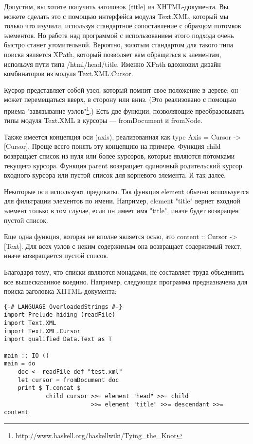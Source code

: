 Допустим, вы хотите получить заголовок (title) из XHTML-документа. Вы можете сделать это с помощью интерфейса модуля Text.XML, который мы только что изучили, используя стандартное сопоставление с образцом потомков элементов. Но работа над программой с использованием этого подхода очень быстро станет утомительной. Вероятно, золотым стандартом для такого типа поиска является XPath, который позволяет вам обращаться к элементам, используя пути типа /html/head/title. Именно XPath вдохновил дизайн комбинаторов из модуля Text.XML.Cursor.

Кусрор представляет собой узел, который помнит свое положение в дереве; он может перемещаться вверх, в сторону или вниз. (Это реализовано с помощью приема "завязывание узлов"\footnote{http://www.haskell.org/haskellwiki/Tying_the_Knot}.) Есть две функции, позволяющие преобразовывать типы модуля Text.XML в курсоры --- fromDocument и fromNode.

Также имеется концепция оси (axis), реализованная как type Axis = Cursor -> [Cursor]. Проще всего понять эту концепцию на примере. Функция child возвращает список из нуля или более курсоров, которые являются потомками текущего курсора. Функция parent возвращает одиночный родительский курсор входного курсора или пустой список для корневого элемента. И так далее.

Некоторые оси используют предикаты. Так функция element обычно используется для фильтрации элементов по имени. Например, element "title" вернет входной элемент только в том случае, если он имеет имя "title", иначе будет возвращен пустой список.

Еще одна функция, которая не вполне является осью, это content :: Cursor -> [Text]. Для всех узлов с неким содержимым она возвращает содержимый текст, иначе возвращается пустой список.

Благодаря тому, что списки являются монадами, не составляет труда объединить все вышесказанное воедино. Например, следующая программа предназначена для поиска заголовка XHTML-документа:

\begin{lstlisting}
{-# LANGUAGE OverloadedStrings #-}
import Prelude hiding (readFile)
import Text.XML
import Text.XML.Cursor
import qualified Data.Text as T

main :: IO ()
main = do
    doc <- readFile def "test.xml"
    let cursor = fromDocument doc
    print $ T.concat $
            child cursor >>= element "head" >>= child
                         >>= element "title" >>= descendant >>= content
\end{lstlisting}

